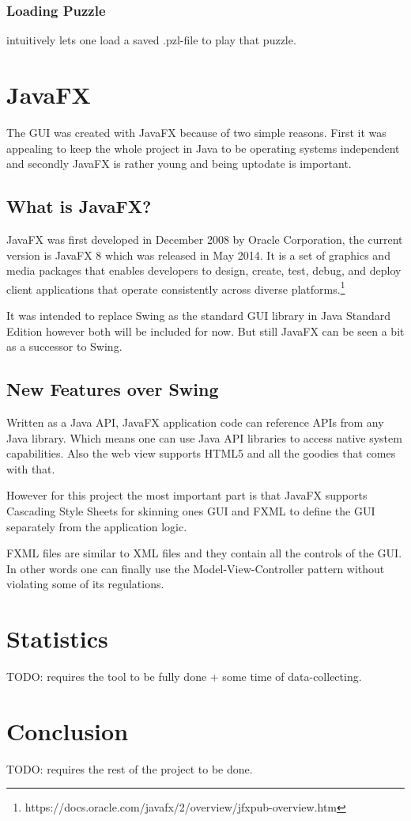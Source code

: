 \subsection{Loading Puzzle} intuitively lets one load a saved .pzl-file to play that puzzle.

\chapter{JavaFX} \label{JavaFX}
The GUI was created with JavaFX because of two simple reasons. First it was appealing to keep the whole project in Java to be operating systems independent and secondly JavaFX is rather young and being uptodate is important.

\section{What is JavaFX?}
JavaFX was first developed in December 2008 by Oracle Corporation, the current version is JavaFX 8 which was released in May 2014. It is a set of graphics and media packages that enables developers to design, create, test, debug, and deploy client applications that operate consistently across diverse platforms.\footnote{https://docs.oracle.com/javafx/2/overview/jfxpub-overview.htm} 

It was intended to replace Swing as the standard GUI library in Java Standard Edition however both will be included for now. But still JavaFX can be seen a bit as a successor to Swing.

\section{New Features over Swing}
Written as a Java API, JavaFX application code can reference APIs from any Java library. Which means one can use Java API libraries to access native system capabilities. 
Also the web view supports HTML5 and all the goodies that comes with that.

However for this project the most important part is that JavaFX supports Cascading Style Sheets for skinning ones GUI and FXML to define the GUI separately from the application logic.

FXML files are similar to XML files and they contain all the controls of the GUI. In other words one can finally use the Model-View-Controller pattern without violating some of its regulations.

\chapter{Statistics} \label{Statistics}
TODO: requires the tool to be fully done + some time of data-collecting.

\chapter{Conclusion} \label{Conclusion}
TODO: requires the rest of the project to be done.